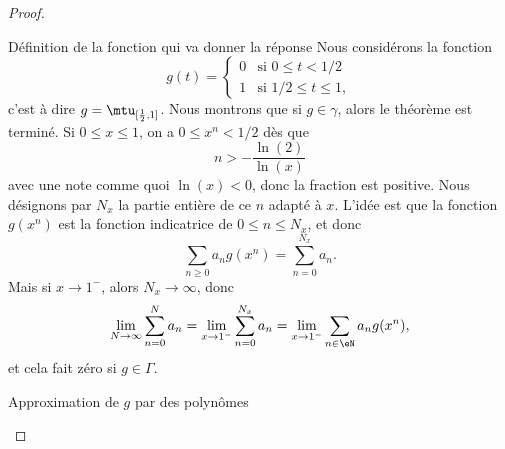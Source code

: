 \begin{proof}
\begin{subproof}
    \item[Définition de la fonction qui va donner la réponse]
        Nous considérons la fonction 
        \begin{equation}
            g(t)=\begin{cases}
                0    &   \text{si } 0\leq t<1/2\\
                1    &    \text{si } 1/2\leq t\leq 1,
            \end{cases}
        \end{equation}
        c'est à dire \( g=\mtu_{\mathopen[ \frac{ 1 }{2} , 1 \mathclose]}\). Nous montrons que si \( g\in \gamma\), alors le théorème est terminé. Si \( 0\leq x\leq 1\), on a \( 0\leq x^n<1/2\) dès que
        \begin{equation}
            n>-\frac{ \ln(2) }{ \ln(x) }
        \end{equation}
        avec une note comme quoi \( \ln(x)<0\), donc la fraction est positive. Nous désignons par \( N_x\) la partie entière de ce \( n\) adapté à \( x\). L'idée est que la fonction  \( g(x^n)\) est la fonction indicatrice de \(0 \leq n\leq N_x\), et donc
        \begin{equation}
            \sum_{n\geq 0}a_ng(x^n)=\sum_{n=0}^{N_x}a_n.
        \end{equation}
        Mais si \( x\to 1^-\), alors \( N_x\to \infty\), donc
        \begin{equation}
            \lim_{N\to \infty} \sum_{n=0}^Na_n=\lim_{x\to 1^-} \sum_{n=0}^{N_x}a_n=\lim_{x\to 1^-} \sum_{n\in \eN}a_ng(x^n),
        \end{equation}
        et cela fait zéro si \( g\in \Gamma\).

    \item[Approximation de \( g\) par des polynômes]


\end{subproof}
\end{proof}
